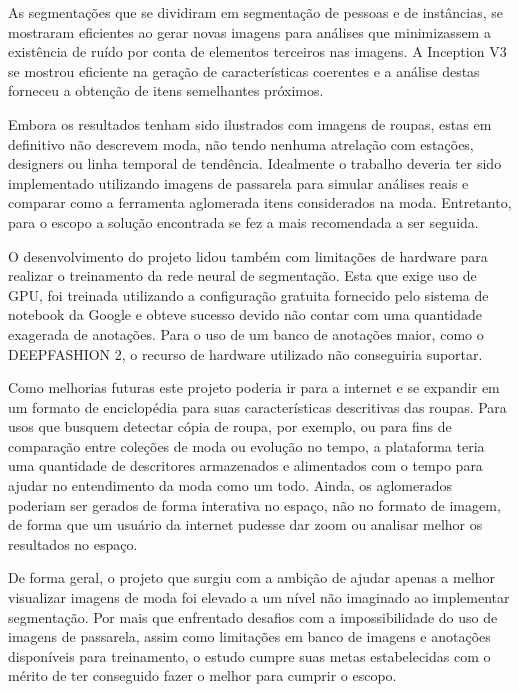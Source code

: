 \documentclass[12pt]{report}
\begin{document}
As segmentações que se dividiram em segmentação de pessoas e de instâncias, se mostraram eficientes ao gerar novas imagens para análises que minimizassem a existência de ruído por conta de elementos terceiros nas imagens. A Inception V3 se mostrou eficiente na geração de características coerentes e a análise destas forneceu a obtenção de itens semelhantes próximos. 

Embora os resultados tenham sido ilustrados com imagens de roupas, estas em definitivo não descrevem moda, não tendo nenhuma atrelação com estações, designers ou linha temporal de tendência. Idealmente o trabalho deveria ter sido implementado utilizando imagens de passarela para simular análises reais e comparar como a ferramenta aglomerada itens considerados na moda. Entretanto, para o escopo a solução encontrada se fez a mais recomendada a ser seguida. 

O desenvolvimento do projeto lidou também com limitações de hardware para realizar o treinamento da rede neural de segmentação. Esta que exige uso de GPU, foi treinada utilizando a configuração gratuita fornecido pelo sistema de notebook da Google e obteve sucesso devido não contar com uma quantidade exagerada de anotações. Para o uso de um banco de anotações maior, como o DEEPFASHION 2, o recurso de hardware utilizado não conseguiria suportar.

Como melhorias futuras este projeto poderia ir para a internet e se expandir em um formato de enciclopédia para suas características descritivas das roupas. Para usos que busquem detectar cópia de roupa, por exemplo, ou para fins de comparação entre coleções de moda ou evolução no tempo, a plataforma teria uma quantidade de descritores armazenados e alimentados com o tempo para ajudar no entendimento da moda como um todo. Ainda, os aglomerados poderiam ser gerados de forma interativa no espaço, não no formato de imagem, de forma que um usuário da internet pudesse dar zoom ou analisar melhor os resultados no espaço.

De forma geral, o projeto que surgiu com a ambição de ajudar apenas a melhor visualizar imagens de moda foi elevado a um nível não imaginado ao implementar segmentação. Por mais que enfrentado desafios com a impossibilidade do uso de imagens de passarela, assim como limitações em banco de imagens e anotações disponíveis para treinamento, o estudo cumpre suas metas estabelecidas com o mérito de ter conseguido fazer o melhor para cumprir o escopo.

\newpage

\end{document}
